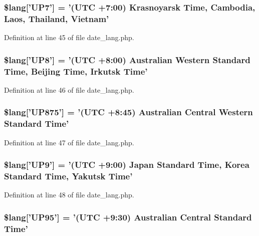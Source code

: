 \subsubsection[{\$lang}]{\setlength{\rightskip}{0pt plus 5cm}\$lang['U\-P7'] = '(U\-T\-C +7\-:00) Krasnoyarsk Time, Cambodia, Laos, Thailand, Vietnam'}\label{date__lang_8php_aeedffaf1d3a16a41e881d85c420482ce}


Definition at line 45 of file date\-\_\-lang.\-php.

\subsubsection[{\$lang}]{\setlength{\rightskip}{0pt plus 5cm}\$lang['U\-P8'] = '(U\-T\-C +8\-:00) Australian Western Standard Time, Beijing Time, Irkutsk Time'}\label{date__lang_8php_a2a828a680158ca4cfb7fba60f35c67a3}


Definition at line 46 of file date\-\_\-lang.\-php.

\subsubsection[{\$lang}]{\setlength{\rightskip}{0pt plus 5cm}\$lang['U\-P875'] = '(U\-T\-C +8\-:45) Australian Central Western Standard Time'}\label{date__lang_8php_a486696d3d41c5d263a8b550903052ecb}


Definition at line 47 of file date\-\_\-lang.\-php.

\subsubsection[{\$lang}]{\setlength{\rightskip}{0pt plus 5cm}\$lang['U\-P9'] = '(U\-T\-C +9\-:00) Japan Standard Time, Korea Standard Time, Yakutsk Time'}\label{date__lang_8php_aa112bfd057369e5adb437c55457c9f79}


Definition at line 48 of file date\-\_\-lang.\-php.

\subsubsection[{\$lang}]{\setlength{\rightskip}{0pt plus 5cm}\$lang['U\-P95'] = '(U\-T\-C +9\-:30) Australian Central Standard Time'}\label{date__lang_8php_a96965669ac4830ab024b39a4ebb763f1}



